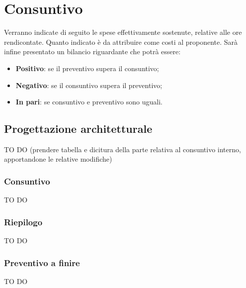 %


\section{Consuntivo} %
\label{sec:consuntivo}
Verranno indicate di seguito le spese effettivamente sostenute, relative alle ore rendicontate. Quanto indicato è da attribuire come costi al proponente. \newline
Sarà infine presentato un bilancio riguardante che potrà essere:
	\begin{itemize}
		\item \textbf{Positivo}: se il preventivo supera il consuntivo;
		\item \textbf{Negativo}: se il consuntivo supera il preventivo;
		\item \textbf{In pari}: se consuntivo e preventivo sono uguali.
	\end{itemize}

	\subsection{Progettazione architetturale} %
	\label{sub:progettazione_architetturale}
	TO DO (prendere tabella e dicitura della parte relativa al consuntivo interno, apportandone le relative modifiche)
		\subsubsection{Consuntivo} %
		\label{ssub:consuntivo}
		TO DO

		\subsubsection{Riepilogo} %
		\label{ssub:riepilogo}
		TO DO

		\subsubsection{Preventivo a finire} %
		\label{ssub:preventivo_a_finire}
		TO DO

